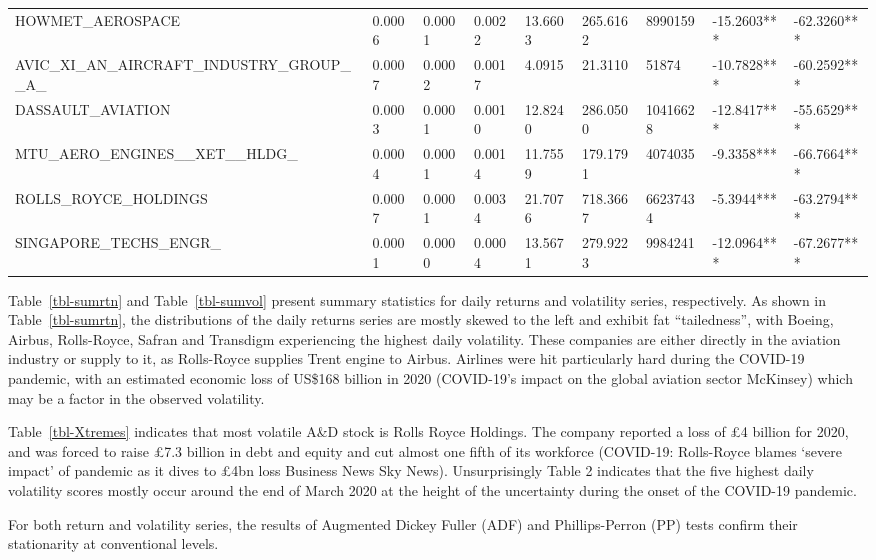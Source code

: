 \documentclass[
  letterpaper,
  DIV=11,
  numbers=noendperiod]{scrartcl}
\begin{document}
\begin{table}[H]
{\begin{tabular}[t]{lllllllll}
\addlinespace
HOWMET\_AEROSPACE & 0.0006 & 0.0001 & 0.0022 & 13.6603 & 265.6162 & 8990159 & -15.2603*** & -62.3260***\\
AVIC\_XI\_AN\_AIRCRAFT\_INDUSTRY\_GROUP\_\_A\_ & 0.0007 & 0.0002 & 0.0017 & 4.0915 & 21.3110 & 51874 & -10.7828*** & -60.2592***\\
DASSAULT\_AVIATION & 0.0003 & 0.0001 & 0.0010 & 12.8240 & 286.0500 & 10416628 & -12.8417*** & -55.6529***\\
MTU\_AERO\_ENGINES\_\_XET\_\_HLDG\_ & 0.0004 & 0.0001 & 0.0014 & 11.7559 & 179.1791 & 4074035 & -9.3358*** & -66.7664***\\
ROLLS\_ROYCE\_HOLDINGS & 0.0007 & 0.0001 & 0.0034 & 21.7076 & 718.3667 & 66237434 & -5.3944*** & -63.2794***\\
\addlinespace
SINGAPORE\_TECHS\_ENGR\_ & 0.0001 & 0.0000 & 0.0004 & 13.5671 & 279.9223 & 9984241 & -12.0964*** & -67.2677***\\
\bottomrule
\end{tabular}}
\end{table}

Table~\ref{tbl-sumrtn} and Table~\ref{tbl-sumvol} present summary
statistics for daily returns and volatility series, respectively. As
shown in Table~\ref{tbl-sumrtn}, the distributions of the daily returns
series are mostly skewed to the left and exhibit fat ``tailedness'',
with Boeing, Airbus, Rolls-Royce, Safran and Transdigm experiencing the
highest daily volatility. These companies are either directly in the
aviation industry or supply to it, as Rolls-Royce supplies Trent engine
to Airbus. Airlines were hit particularly hard during the COVID-19
pandemic, with an estimated economic loss of US\$168 billion in 2020
(COVID-19's impact on the global aviation sector \textbar{} McKinsey)
which may be a factor in the observed volatility.

Table~\ref{tbl-Xtremes} indicates that most volatile A\&D stock is Rolls
Royce Holdings. The company reported a loss of £4 billion for 2020, and
was forced to raise £7.3 billion in debt and equity and cut almost one
fifth of its workforce (COVID-19: Rolls-Royce blames `severe impact' of
pandemic as it dives to £4bn loss \textbar{} Business News \textbar{}
Sky News). Unsurprisingly Table 2 indicates that the five highest daily
volatility scores mostly occur around the end of March 2020 at the
height of the uncertainty during the onset of the COVID-19 pandemic.

For both return and volatility series, the results of Augmented Dickey
Fuller (ADF) and Phillips-Perron (PP) tests confirm their stationarity
at conventional levels.
\end{document}
